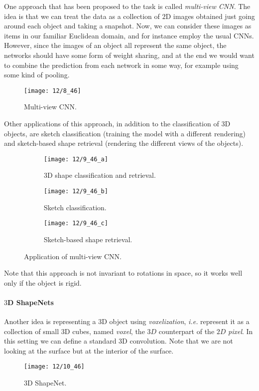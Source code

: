 One approach that has been proposed to the task is called \emph{multi-view CNN}. The idea is that we can treat the data as a collection of $2$D images obtained just going around each object and taking a snapshot. Now, we can consider these images as items in our familiar Euclidean domain, and for instance employ the usual CNNs. However, since the images of an object all represent the same object, the networks should have some form of weight sharing, and at the end we would want to combine the prediction from each network in some way, for example using some kind of pooling.
\begin{figure}[H]
	\centering
	\texttt{[image: 12/8\_46]}
	\caption{Multi-view CNN.}\label{fig:multi-viewCNN}	
\end{figure}
Other applications of this approach, in addition to the classification of $3$D objects, are sketch classification (training the model with a different rendering) and sketch-based shape retrieval (rendering the different views of the objects).
\begin{figure}[H]
	\centering
	\begin{subfigure}[t]{0.3\linewidth}
		\centering
		\texttt{[image: 12/9\_46\_a]}
		\caption{3D shape classification and retrieval.}
	\end{subfigure}
	\hfill
	\begin{subfigure}[t]{0.3\linewidth}
		\centering
		\texttt{[image: 12/9\_46\_b]}
		\caption{Sketch classification.}
	\end{subfigure}
	\hfill
	\begin{subfigure}[t]{0.3\linewidth}
		\centering
		\texttt{[image: 12/9\_46\_c]}
		\caption{Sketch-based shape retrieval.}
	\end{subfigure}
	\caption{Application of multi-view CNN.}\label{fig:app-multiviewCNN}
\end{figure}
Note that this approach is not invariant to rotations in space, so it works well only if the object is rigid.

\paragraph{$3$D ShapeNets}
Another idea is representing a $3$D object using \emph{voxelization}, \textit{i.e.} represent it as a collection of small $3$D cubes, named \emph{voxel}, the $3D$ counterpart of the $2D$ \emph{pixel}. In this setting we can define a standard $3$D convolution. Note that we are not looking at the surface but at the interior of the surface.
\begin{figure}[H]
	\centering
	\texttt{[image: 12/10\_46]}
	\caption{$3$D ShapeNet.}\label{fig:3d-shapenet}	
\end{figure}

